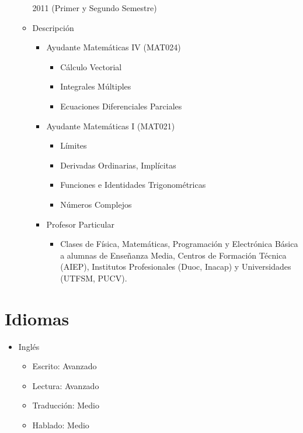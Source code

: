 \documentclass[11pt,letterpaper,sans]{moderncv}
\begin{document}
\begin{itemize}
\begin{itemize}
2011 (Primer y Segundo Semestre)
\item Descripción
\begin{itemize}
\item Ayudante Matemáticas IV (MAT024)
\begin{itemize}
\item Cálculo Vectorial
\item Integrales Múltiples
\item Ecuaciones Diferenciales Parciales
\end{itemize}
\item Ayudante Matemáticas I (MAT021)
\begin{itemize}
\item Límites
\item Derivadas Ordinarias, Implícitas
\item Funciones e Identidades Trigonométricas
\item Números Complejos
\end{itemize}
\item Profesor Particular
\begin{itemize}
\item Clases de Física, Matemáticas, Programación y Electrónica Básica
a alumnas de Enseñanza Media, Centros de Formación Técnica (AIEP),
Institutos Profesionales (Duoc, Inacap) y Universidades (UTFSM, PUCV).
\end{itemize}
\end{itemize}
\end{itemize}
\end{itemize}
\section{Idiomas}
\label{sec:org669ecce}
\begin{itemize}
\item Inglés 
\begin{itemize}
\item Escrito: Avanzado
\item Lectura: Avanzado
\item Traducción: Medio
\item Hablado: Medio
\end{itemize}
\end{itemize}
\end{document}

